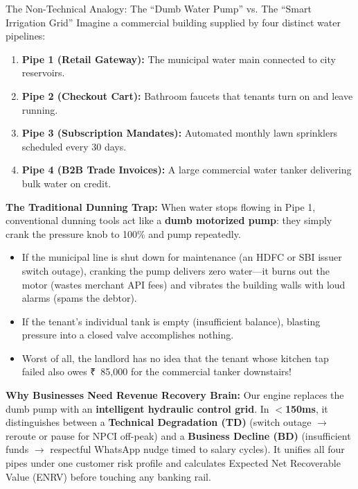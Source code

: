 \documentclass[11pt, a4paper]{article}
\newcommand{\INR}{{\rupeefont ₹}}
\begin{document}
\begin{calloutbox}{The Non-Technical Analogy: The ``Dumb Water Pump'' vs. The ``Smart Irrigation Grid''}
Imagine a commercial building supplied by four distinct water pipelines:
\begin{enumerate}[leftmargin=1.5em, itemsep=2pt]
  \item \textbf{Pipe 1 (Retail Gateway):} The municipal water main connected to city reservoirs.
  \item \textbf{Pipe 2 (Checkout Cart):} Bathroom faucets that tenants turn on and leave running.
  \item \textbf{Pipe 3 (Subscription Mandates):} Automated monthly lawn sprinklers scheduled every 30 days.
  \item \textbf{Pipe 4 (B2B Trade Invoices):} A large commercial water tanker delivering bulk water on credit.
\end{enumerate}

\textbf{The Traditional Dunning Trap:}
When water stops flowing in Pipe 1, conventional dunning tools act like a \textbf{dumb motorized pump}: they simply crank the pressure knob to 100\% and pump repeatedly.
\begin{itemize}[leftmargin=1.5em, itemsep=2pt]
  \item If the municipal line is shut down for maintenance (an HDFC or SBI issuer switch outage), cranking the pump delivers zero water---it burns out the motor (wastes merchant API fees) and vibrates the building walls with loud alarms (spams the debtor).
  \item If the tenant's individual tank is empty (insufficient balance), blasting pressure into a closed valve accomplishes nothing.
  \item Worst of all, the landlord has no idea that the tenant whose kitchen tap failed also owes \INR~85,000 for the commercial tanker downstairs!
\end{itemize}

\textbf{Why Businesses Need Revenue Recovery Brain:}
Our engine replaces the dumb pump with an \textbf{intelligent hydraulic control grid}. In \textbf{$<$150ms}, it distinguishes between a \textbf{Technical Degradation (TD)} (switch outage $\rightarrow$ reroute or pause for NPCI off-peak) and a \textbf{Business Decline (BD)} (insufficient funds $\rightarrow$ respectful WhatsApp nudge timed to salary cycles). It unifies all four pipes under one customer risk profile and calculates Expected Net Recoverable Value (ENRV) before touching any banking rail.
\end{calloutbox}
\end{document}
